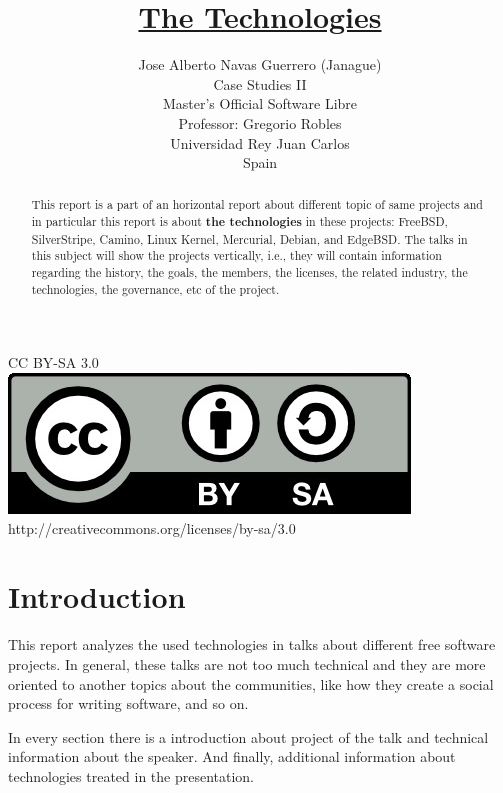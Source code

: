 \documentclass[11pt]{article}
\title{\textbf{\underline{The Technologies}}}
\author{
        Jose Alberto Navas Guerrero (Janague)\\
                Case Studies II\\
       Master's Official Software Libre\\
       Professor: Gregorio Robles\\
	Universidad Rey Juan Carlos\\
        Spain
}
\begin{document}
\maketitle

\begin{abstract}
 This report is a part of an horizontal report about different topic of same projects and in particular this report is about \textbf{the technologies} in these projects: FreeBSD, SilverStripe, Camino, Linux Kernel, Mercurial, Debian, and EdgeBSD. The talks in this subject will show the projects vertically, i.e., they will contain information regarding the history, the goals, the members, the licenses, the related industry, the technologies, the governance, etc of the project. 
\end{abstract}


\begin{center}
\textsc CC BY-SA 3.0\\[0.2cm]
\includegraphics[scale=0.5]{img/by-sa} \\ %
{\small http://creativecommons.org/licenses/by-sa/3.0}\\

\end{center}
\newpage

\tableofcontents


\newpage

\section{Introduction}

This report analyzes the used technologies in talks about different free software projects. In general, these talks are not too much technical and they are more oriented to another topics about the communities, like how they create a social process for writing software, and so on.

In every section there is a introduction about project of the talk and technical information about the speaker. And finally, additional information about technologies treated in the presentation.  
\end{document}
